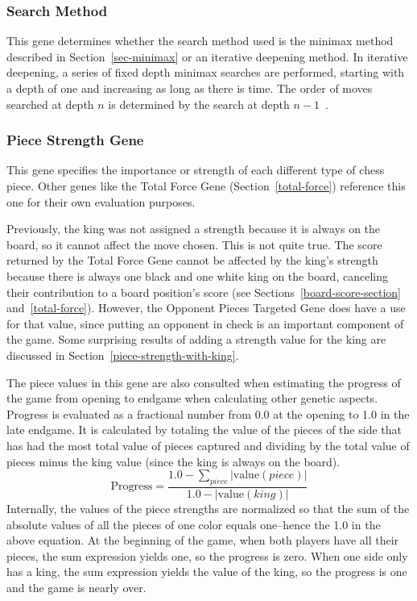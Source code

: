 \documentclass[letterpaper]{article}
\renewcommand{\_}{\allowbreak\textunderscore\allowbreak}
\begin{document}
\subsubsection{Search Method}
This gene determines whether the search method used is the minimax method described in Section~\ref{sec-minimax} or an iterative deepening method. In iterative deepening, a series of fixed depth minimax searches are performed, starting with a depth of one and increasing as long as there is time. The order of moves searched at depth \(n\) is determined by the search at depth \(n-1\)~\cite{iterative-deepening}.

\subsubsection{Piece Strength Gene}\label{piece-strength}
This gene specifies the importance or strength of each different type of chess piece. Other genes like the Total Force Gene (Section~\ref{total-force}) reference this one for their own evaluation purposes.

Previously, the king was not assigned a strength because it is always on the board, so it cannot affect the move chosen. This is not quite true. The score returned by the Total Force Gene cannot be affected by the king's strength because there is always one black and one white king on the board, canceling their contribution to a board position's score (see Sections~\ref{board-score-section} and~\ref{total-force}). However, the Opponent Pieces Targeted Gene does have a use for that value, since putting an opponent in check is an important component of the game. Some surprising results of adding a strength value for the king are discussed in Section~\ref{piece-strength-with-king}.

The piece values in this gene are also consulted when estimating the progress of the game from opening to endgame when calculating other genetic aspects. Progress is evaluated as a fractional number from 0.0 at the opening to 1.0 in the late endgame. It is calculated by totaling the value of the pieces of the side that has had the most total value of pieces captured and dividing by the total value of pieces minus the king value (since the king is always on the board).
\[
\textrm{Progress} = \frac{1.0 - \sum_{piece} |\textrm{value}(piece)|}{1.0 - |\textrm{value}(king)|}
\]
Internally, the values of the piece strengths are normalized so that the sum of the absolute values of all the pieces of one color equals one--hence the 1.0 in the above equation. At the beginning of the game, when both players have all their pieces, the sum expression yields one, so the progress is zero. When one side only has a king, the sum expression yields the value of the king, so the progress is one and the game is nearly over.
\end{document}
